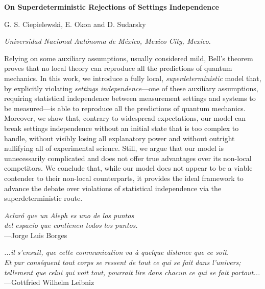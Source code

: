 \documentclass[letterpaper,12pt]{article}
\begin{document}
\begin{center}	
\begin{LARGE}
\textbf{On Superdeterministic Rejections of Settings Independence}\\
\end{LARGE}
\end{center}

\begin{center}
\begin{large}
G. S. Ciepielewski, E. Okon and D. Sudarsky\\
\end{large}
\textit{Universidad Nacional Aut\'onoma de M\'exico, Mexico City, Mexico.}\\
\end{center}

Relying on some auxiliary assumptions, usually considered mild, Bell's theorem proves that no local theory can reproduce all the predictions of quantum mechanics. In this work, we introduce a fully local, \emph{superdeterministic} model that, by explicitly violating \emph{settings independence}---one of these auxiliary assumptions, requiring statistical independence between measurement settings and systems to be measured---is able to reproduce all the predictions of quantum mechanics. Moreover, we show that, contrary to widespread expectations, our model can break settings independence without an initial state that is too complex to handle, without visibly losing all explanatory power and without outright nullifying all of experimental science. Still, we argue that our model is unnecessarily complicated and does not offer true advantages over its non-local competitors. We conclude that, while our model does not appear to be a viable contender to their non-local counterparts, it provides the ideal framework to advance the debate over violations of statistical independence via the superdeterministic route.

\begin{flushright}
\textit{Aclar\'o que un Aleph es uno de los puntos \\ del espacio que contienen todos los puntos.}\\ ---Jorge Luis Borges
\end{flushright}

\begin{flushright}
\textit{...il s’ensuit, que cette communication va à quelque distance que ce soit. \\ Et par conséquent tout corps se ressent de tout ce qui se fait dans l’univers; \\ tellement que celui qui voit tout, pourrait lire dans chacun ce qui se fait partout...}\\ ---Gottfried Wilhelm Leibniz
\end{flushright}
\end{document}
